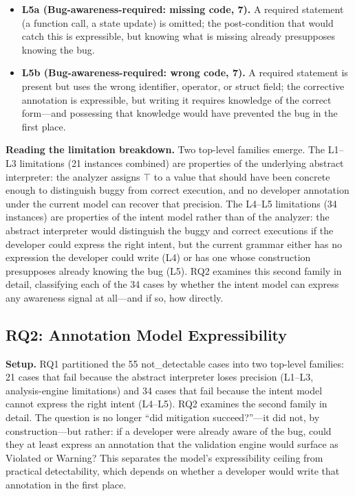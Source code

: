 \documentclass[pdflatex,sn-basic]{sn-jnl}%
\theoremstyle{thmstyleone}%
\theoremstyle{thmstyletwo}%
\theoremstyle{thmstylethree}%
\begin{document}
\begin{itemize}
  \item \textbf{L5a (Bug-awareness-required: missing code, 7).} A required statement (a function call, a state update) is omitted; the post-condition that would catch this is expressible, but knowing what is missing already presupposes knowing the bug.
  \item \textbf{L5b (Bug-awareness-required: wrong code, 7).} A required statement is present but uses the wrong identifier, operator, or struct field; the corrective annotation is expressible, but writing it requires knowledge of the correct form---and possessing that knowledge would have prevented the bug in the first place.
\end{itemize}

\smallskip
\noindent\textbf{Reading the limitation breakdown.}
Two top-level families emerge.
The L1--L3 limitations (21 instances combined) are properties of the underlying abstract interpreter: the analyzer assigns $\top$ to a value that should have been concrete enough to distinguish buggy from correct execution, and no developer annotation under the current model can recover that precision.
The L4--L5 limitations (34 instances) are properties of the intent model rather than of the analyzer: the abstract interpreter would distinguish the buggy and correct executions if the developer could express the right intent, but the current grammar either has no expression the developer could write (L4) or has one whose construction presupposes already knowing the bug (L5).
RQ2 examines this second family in detail, classifying each of the 34 cases by whether the intent model can express any awareness signal at all---and if so, how directly.

\subsection{RQ2: Annotation Model Expressibility}\label{sec:rq2}

\noindent\textbf{Setup.}
RQ1 partitioned the 55 not\_detectable cases into two top-level families: 21 cases that fail because the abstract interpreter loses precision (L1--L3, analysis-engine limitations) and 34 cases that fail because the intent model cannot express the right intent (L4--L5).
RQ2 examines the second family in detail.
The question is no longer ``did mitigation succeed?''---it did not, by construction---but rather: if a developer were already aware of the bug, could they at least express an annotation that the validation engine would surface as Violated or Warning?
This separates the model's expressibility ceiling from practical detectability, which depends on whether a developer would write that annotation in the first place.
\end{document}

